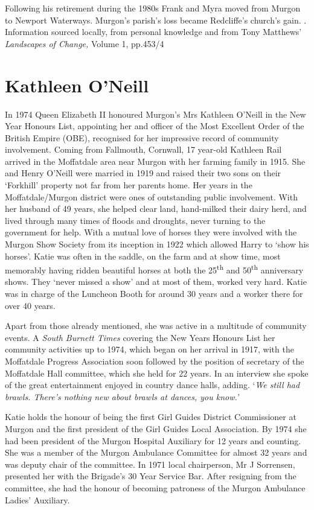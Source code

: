 Following his retirement during the 1980s Frank and Myra moved from Murgon to Newport Waterways. Murgon's parish's loss became Redcliffe's church's gain. . Information sourced locally, from personal knowledge and from Tony Matthews' \emph{Landscapes of Change,} Volume 1, pp.453/4

\hypertarget{kathleen-oneill}{%
\section{Kathleen O'Neill}\label{kathleen-oneill}}

In 1974 Queen Elizabeth II honoured Murgon's Mrs Kathleen O'Neill in the New Year Honours List, appointing her and officer of the Most Excellent Order of the British Empire (OBE), recognised for her impressive record of community involvement. Coming from Fallmouth, Cornwall, 17 year-old Kathleen Rail arrived in the Moffatdale area near Murgon with her farming family in 1915. She and Henry O'Neill were married in 1919 and raised their two sons on their `Forkhill' property not far from her parents home. Her years in the Moffatdale/Murgon district were ones of outstanding public involvement. With her husband of 49 years, she helped clear land, hand-milked their dairy herd, and lived through many times of floods and droughts, never turning to the government for help. With a mutual love of horses they were involved with the Murgon Show Society from its inception in 1922 which allowed Harry to `show his horses'. Katie was often in the saddle, on the farm and at show time, most memorably having ridden beautiful horses at both the 25\textsuperscript{th} and 50\textsuperscript{th} anniversary shows. They `never missed a show' and at most of them, worked very hard. Katie was in charge of the Luncheon Booth for around 30 years and a worker there for over 40 years.

Apart from those already mentioned, she was active in a multitude of community events. A \emph{South Burnett Times} covering the New Years Honours List her community activities up to 1974, which began on her arrival in 1917, with the Moffatdale Progress Association soon followed by the position of secretary of the Moffatdale Hall committee, which she held for 22 years. In an interview she spoke of the great entertainment enjoyed in country dance halls, adding. `\emph{We still had brawls. There's nothing new about brawls at dances, you know.'}

Katie holds the honour of being the first Girl Guides District Commissioner at Murgon and the first president of the Girl Guides Local Association. By 1974 she had been president of the Murgon Hospital Auxiliary for 12 years and counting. She was a member of the Murgon Ambulance Committee for almost 32 years and was deputy chair of the committee. In 1971 local chairperson, Mr J Sorrensen, presented her with the Brigade's 30 Year Service Bar. After resigning from the committee, she had the honour of becoming patroness of the Murgon Ambulance Ladies' Auxiliary.

